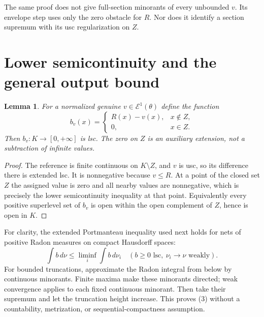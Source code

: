\documentclass[11pt]{article}
\newtheorem{lemma}[theorem]{Lemma}
\newcommand{\Eone}{\mathcal E^1}
\begin{document}
The same proof does not give full-section minorants of every unbounded
$v$. Its envelope step uses only the zero obstacle for $R$. Nor does
it identify a section supremum with its usc regularization on $Z$.

\section{Lower semicontinuity and the general output bound}
\begin{lemma}\label{lsc}
For a normalized genuine $v\in\Eone(\theta)$ define the function
\[
 b_v(x)=
 \begin{cases}R(x)-v(x),&x\notin Z,\\0,&x\in Z.\end{cases}       \tag{2}
\]
Then $b_v:K\to[0,+\infty]$ is lsc. The zero on $Z$ is an auxiliary
extension, not a subtraction of infinite values.
\end{lemma}
\begin{proof}
The reference is finite continuous on $K\setminus Z$, and $v$ is usc,
so its difference there is extended lsc. It is nonnegative because
$v\leq R$. At a point of the closed set $Z$ the assigned value is
zero and all nearby values are nonnegative, which is precisely the
lower semicontinuity inequality at that point. Equivalently every
positive superlevel set of $b_v$ is open within the open complement
of $Z$, hence is open in $K$.
\end{proof}

For clarity, the extended Portmanteau inequality used next holds for
nets of positive Radon measures on compact Hausdorff spaces:
\[
         \int b\,d\nu\leq\liminf_i\int b\,d\nu_i
         \quad(b\geq0\text{ lsc},\ \nu_i\to\nu\text{ weakly}).
                                                               \tag{3}
\]
For bounded truncations, approximate the Radon integral from below by
continuous minorants. Finite maxima make these minorants directed;
weak convergence applies to each fixed continuous minorant. Then take
their supremum and let the truncation height increase. This proves
(3) without a countability, metrization, or sequential-compactness
assumption.
\end{document}
